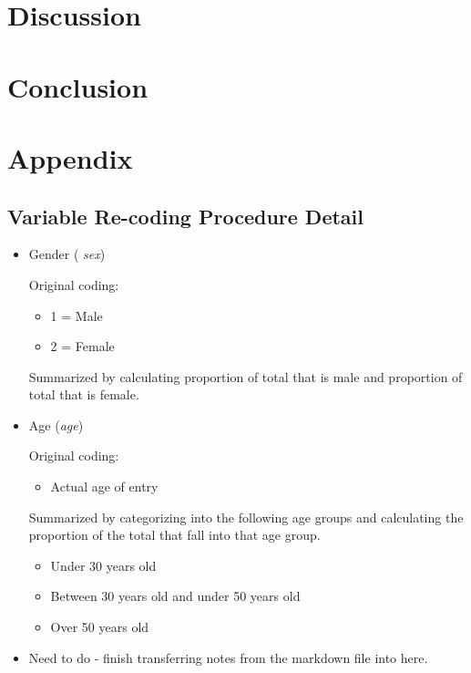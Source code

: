 \documentclass{article}
\begin{document}
\section{Discussion}

\section{Conclusion}

\section{Appendix}

\subsection{Variable Re-coding Procedure Detail}

\begin{itemize}
\item
Gender ( \emph{sex})

Original coding:
\begin{itemize}
\item
1 = Male
\item
2 = Female
\end{itemize}
Summarized by calculating proportion of total that is male and proportion of total that is female.

\item
Age (\emph{age})

Original coding:
\begin{itemize}
\item
Actual age of entry
\end{itemize}
Summarized by categorizing into the following age groups and calculating the proportion of the total that fall into that age group.
\begin{itemize}
\item
Under 30 years old
\item
Between 30 years old and under 50 years old
\item
Over 50 years old
\end{itemize}

\item
Need to do - finish transferring notes from the markdown file into here.

\end{itemize}
\end{document}

